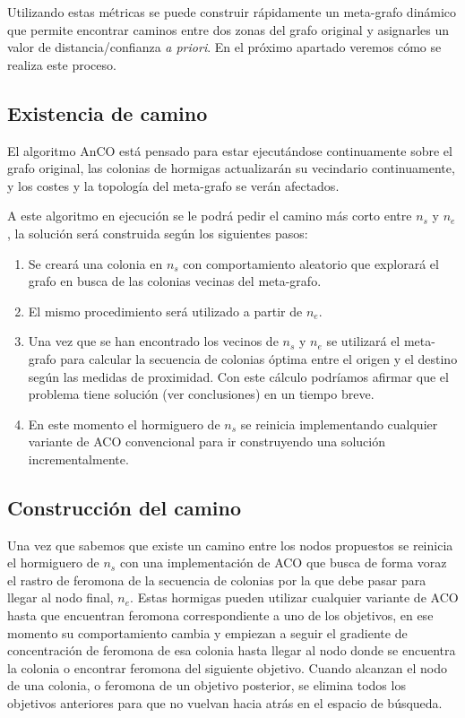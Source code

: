 \documentclass{llncs}
\begin{document}
Utilizando estas m{\'e}tricas se puede construir r{\'a}pidamente un meta-grafo din{\'a}mico que permite encontrar caminos entre dos zonas del grafo original y asignarles un valor de distancia/confianza \textit{a priori}.
En el pr{\'o}ximo apartado veremos c{\'o}mo se realiza este proceso.

\subsection{Existencia de camino}
El algoritmo AnCO est{\'a} pensado para estar ejecut{\'a}ndose continuamente sobre el grafo original, las colonias de hormigas actualizar{\'a}n su vecindario continuamente, y los costes y la topolog{\'i}a del meta-grafo se ver{\'a}n afectados.

A este algoritmo en ejecuci{\'o}n se le podr{\'a} pedir el camino m{\'a}s corto entre $n_s$ y $n_e$, la soluci{\'o}n ser{\'a} construida seg{\'u}n los siguientes pasos:

\begin{enumerate}
  \item Se crear{\'a} una colonia en $n_s$ con comportamiento aleatorio que explorar{\'a} el grafo en busca de las colonias vecinas del meta-grafo.
  \item El mismo procedimiento ser{\'a} utilizado a partir de $n_e$.
  \item Una vez que se han encontrado los vecinos de $n_s$ y $n_e$ se utilizar{\'a} el meta-grafo para calcular la secuencia de colonias {\'o}ptima entre el origen y el destino seg{\'u}n las medidas de proximidad. Con este c{\'a}lculo podr{\'i}amos afirmar que el problema tiene soluci{\'o}n (ver conclusiones) en un tiempo breve.
  \item En este momento el hormiguero de $n_s$ se reinicia implementando cualquier variante de ACO convencional para ir construyendo una soluci{\'o}n incrementalmente.
\end{enumerate}

\subsection{Construcci{\'o}n del camino}
Una vez que sabemos que existe un camino entre los nodos propuestos se reinicia el hormiguero de $n_s$ con una implementaci{\'o}n de ACO que busca de forma voraz el rastro de feromona de la secuencia de colonias por la que debe pasar para llegar al nodo final, $n_e$.
Estas hormigas pueden utilizar cualquier variante de ACO hasta que encuentran feromona correspondiente a uno de los objetivos, en ese momento su comportamiento cambia y empiezan a seguir el gradiente de concentraci{\'o}n de feromona de esa colonia hasta llegar al nodo donde se encuentra la colonia o encontrar feromona del siguiente objetivo.
Cuando alcanzan el nodo de una colonia, o feromona de un objetivo posterior, se elimina todos los objetivos anteriores para que no vuelvan hacia atr{\'a}s en el espacio de b{\'u}squeda.
\end{document}
